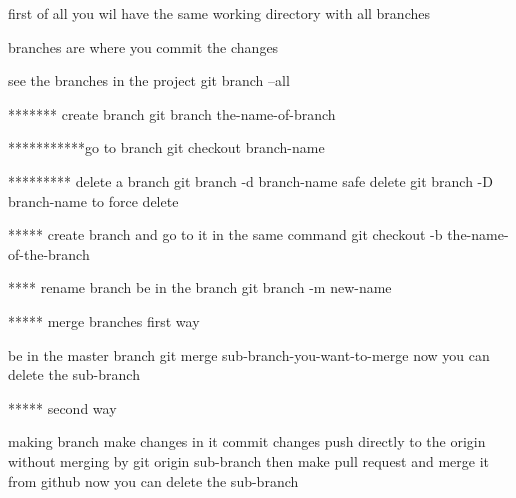 first of all you wil have the same working directory with all branches 

branches are where you commit the changes 


see the branches in the project  
git branch --all 

******* create branch 
git branch the-name-of-branch

***********go to branch 
git checkout branch-name


********* delete a branch 
git branch -d branch-name     safe delete 
git branch -D branch-name  to force delete 

***** create branch and go to it in the same command 
git checkout -b the-name-of-the-branch

**** rename branch 
be in the branch
git branch -m new-name 

***** merge branches 
first way 

be in the master branch 
git merge sub-branch-you-want-to-merge
now you can delete the sub-branch 

***** 
second way 

making branch 
make changes in it 
commit changes 
push directly to the origin without merging by 
  git  origin sub-branch 
then make pull request
  and merge it from github 
now you can delete the sub-branch 
